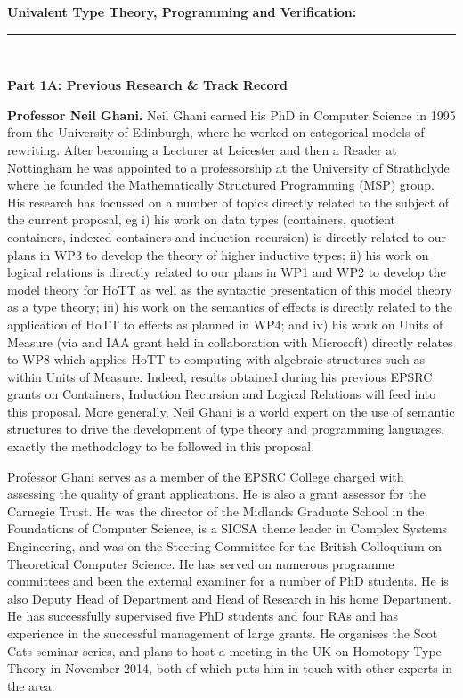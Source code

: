 \documentclass[a4paper,11pt]{article}
\begin{document}
\thispagestyle{plain}
\begin{center}
  {\Large {\bf Univalent Type Theory, Programming and Verification:}}\\[1ex] 

\vspace*{-0.1in}

  \rule{140mm}{.5mm}\\[2ex]
\end{center}

\noindent
{\bf \Large Part 1A: Previous Research \& Track Record}

\textbf{Professor Neil Ghani.} Neil Ghani earned his PhD in Computer
Science in 1995 from the University of Edinburgh, where he worked on
categorical models of rewriting.  After becoming a Lecturer at
Leicester and then a Reader at Nottingham he was appointed to a
professorship at the University of Strathclyde where he founded the
Mathematically Structured Programming (MSP) group. His research has
focussed on a number of topics directly related to the subject of the
current proposal, eg i) his work on data types (containers, quotient
containers, indexed containers and induction recursion) is directly
related to our plans in WP3 to develop the theory of higher inductive
types; ii) his work on logical relations is directly related to our
plans in WP1 and WP2 to develop the model theory for HoTT as well as
the syntactic presentation of this model theory as a type theory; iii)
his work on the semantics of effects is directly related to the
application of HoTT to effects as planned in WP4; and iv) his work on
Units of Measure (via and IAA grant held in collaboration with
Microsoft) directly relates to WP8 which applies HoTT to computing
with algebraic structures such as within Units of Measure. Indeed,
results obtained during his previous EPSRC grants on Containers,
Induction Recursion and Logical Relations will feed into this
proposal.  More generally, Neil Ghani is a world expert on the use of
semantic structures to drive the development of type theory and
programming languages, exactly the methodology to be followed in this
proposal.

Professor Ghani serves as a member of the EPSRC College charged with
assessing the quality of grant applications. He is also a grant
assessor for the Carnegie Trust.  He was the director of the Midlands
Graduate School in the Foundations of Computer Science, is a SICSA
theme leader in Complex Systems Engineering, and was on the Steering
Committee for the British Colloquium on Theoretical Computer Science.
He has served on numerous programme committees and been the external
examiner for a number of PhD students. He is also Deputy Head of
Department and Head of Research in his home Department. He has
successfully supervised five PhD students and four RAs and has
experience in the successful management of large grants. He organises
the Scot Cats seminar series, and plans to host a meeting in the UK on
Homotopy Type Theory in November 2014, both of which puts him in touch
with other experts in the area.
\end{document}
